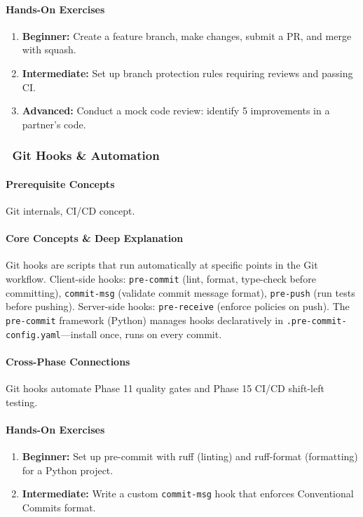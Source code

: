 \documentclass[11pt, a4paper, oneside]{report}
\newcommand{\awareness}[1]{\subsubsection{\texorpdfstring{\fcolorbox{gray!50}{gray!10}{\footnotesize\bfseries\color{gray!50!black} AWARENESS}~#1}{#1}}}
\begin{document}
\paragraph{Hands-On Exercises}
\begin{enumerate}[leftmargin=*]
\item \textbf{Beginner:} Create a feature branch, make changes, submit a PR, and merge with squash.
\item \textbf{Intermediate:} Set up branch protection rules requiring reviews and passing CI.
\item \textbf{Advanced:} Conduct a mock code review: identify 5 improvements in a partner's code.
\end{enumerate}


\awareness{Git Hooks \& Automation}

\paragraph{Prerequisite Concepts} Git internals, CI/CD concept.

\paragraph{Core Concepts \& Deep Explanation} Git hooks are scripts that run automatically at specific points in the Git workflow. Client-side hooks: \texttt{pre-commit} (lint, format, type-check before committing), \texttt{commit-msg} (validate commit message format), \texttt{pre-push} (run tests before pushing). Server-side hooks: \texttt{pre-receive} (enforce policies on push). The \texttt{pre-commit} framework (Python) manages hooks declaratively in \texttt{.pre-commit-config.yaml}---install once, runs on every commit.

\paragraph{Cross-Phase Connections} Git hooks automate Phase 11 quality gates and Phase 15 CI/CD shift-left testing.

\paragraph{Hands-On Exercises}
\begin{enumerate}[leftmargin=*]
\item \textbf{Beginner:} Set up pre-commit with ruff (linting) and ruff-format (formatting) for a Python project.
\item \textbf{Intermediate:} Write a custom \texttt{commit-msg} hook that enforces Conventional Commits format.
\end{enumerate}
\end{document}

